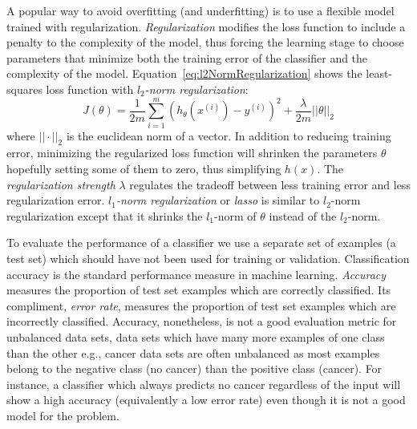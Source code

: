 A popular way to avoid overfitting (and underfitting) is to use a flexible model trained with regularization. \emph{Regularization} modifies the loss function to include a penalty to the complexity of the model, thus forcing the learning stage to choose parameters that minimize both the training error of the classifier and the complexity of the model. Equation~\ref{eq:l2NormRegularization} shows the least-squares loss function with \emph{$l_2$-norm regularization}:
\begin{equation}
	J(\theta) =  \frac{1}{2m}\sum_{i=1}^m(h_\theta(x^{(i)}) - y^{(i)})^2 + \frac{\lambda}{2m} ||\theta||_2
	\label{eq:l2NormRegularization}
\end{equation}
where $||\cdot||_2$ is the euclidean norm of a vector. In addition to reducing training error, minimizing the regularized loss function will shrinken the parameters $\theta$ hopefully setting some of them to zero, thus simplifying $h(x)$. The \emph{regularization strength} $\lambda$ regulates the tradeoff between less training error and less regularization error. \emph{$l_1$-norm regularization} or \emph{lasso} is similar to $l_2$-norm regularization except that it shrinks the $l_1$-norm of $\theta$ instead of the $l_2$-norm.

To evaluate the performance of a classifier we use a separate set of examples (a test set) which should have not been used for training or validation. Classification accuracy is the standard performance measure in machine learning. \emph{Accuracy} measures the proportion of test set examples which are correctly classified. Its compliment, \emph{error rate}, measures the proportion of test set examples which are incorrectly classified. Accuracy, nonetheless, is not a good evaluation metric for unbalanced data sets, data sets which have many more examples of one class than the other e.g., cancer data sets are often unbalanced as most examples belong to the negative class (no cancer) than the positive class (cancer). For instance, a classifier which always predicts no cancer regardless of the input will show a high accuracy (equivalently a low error rate) even though it is not a good model for the problem.

